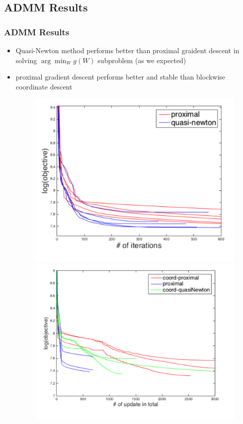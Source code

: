 \documentclass{beamer}
\begin{document}
\subsection{ADMM Results}
\begin{frame}
\frametitle{ADMM Results}
\begin{itemize}
  \item Quasi-Newton method performs better than proximal graident descent in solving $\arg\min_W g(W)$ subproblem (as we expected)
  \item proximal gradient descent performs better and stable than blockwise coordinate descent
  \begin{figure}[htbp]
  \centering
  \begin{minipage}{0.45\textwidth}
    \centering
    \includegraphics[width=.8\textwidth]{images/argminW}
  \end{minipage}
  \hfill
  \begin{minipage}{0.45\textwidth}
    \centering
    \includegraphics[width=.8\textwidth]{images/argminw0wW}
  \end{minipage}
  \end{figure}
\end{itemize}
\end{frame}
\end{document}
